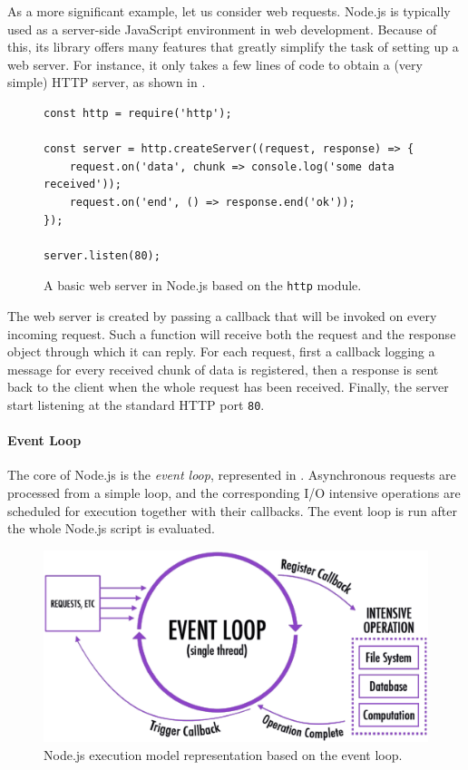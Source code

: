 As a more significant example, let us consider web requests.
Node.js is typically used as a server-side JavaScript environment in web development.
Because of this, its library offers many features that greatly simplify the task of setting up a web server.
For instance, it only takes a few lines of code to obtain a (very simple) HTTP server, as shown in .

\begin{figure}[h]
\begin{lstlisting}
const http = require('http');

const server = http.createServer((request, response) => {
	request.on('data', chunk => console.log('some data received'));
	request.on('end', () => response.end('ok'));
});

server.listen(80);
\end{lstlisting}
\caption{A basic web server in Node.js based on the \lstinline{http} module.}
\label{lst:http}
\end{figure}
The web server is created by passing a callback that will be invoked on every incoming request.
Such a function will receive both the request and the response object through which it can reply.
For each request, first a callback logging a message for every received chunk of data is registered, then a response is sent back to the client when
the whole request has been received. %
Finally, the server start listening at the standard HTTP port \texttt{80}.

\paragraph{Event Loop}
The core of Node.js is the \emph{event loop}, represented in .
Asynchronous requests are processed from a simple loop, and the corresponding I/O intensive operations are scheduled for execution together with their callbacks.
The event loop is run after the whole Node.js script is evaluated.

\begin{figure}[h]
	\centering
	\includegraphics[width=.7\textwidth]{fig/event-loop}
	\caption{Node.js execution model representation based on the event loop.}
	\label{fig:eventloop}
\end{figure}

